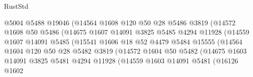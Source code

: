 \begin{lexlean}{RustStd}
\begin{coremodule}
                                @5004
                                @5488
                                @19046
                                (@14564
                                  @1608
                                  @120
                                  @50
                                  @28
                                  @5486
                                  @3819
                                  (@14572
                                    @1608
                                    @50
                                    @5486
                                    (@14675
                                      @1607
                                      @14091
                                      @3825
                                      @5485
                                      @4294
                                      @11928
                                      (@14559
                                        @1607
                                        @14091
                                        @5485
                                        (@15541
                                          @1606
                                          @18
                                          @52
                                          @4479
                                          @5484
                                          @15555
                                          (@14564
                                            @1604
                                            @120
                                            @50
                                            @28
                                            @5482
                                            @3819
                                            (@14572
                                              @1604
                                              @50
                                              @5482
                                              (@14675
                                                @1603
                                                @14091
                                                @3825
                                                @5481
                                                @4294
                                                @11928
                                                (@14559
                                                  @1603
                                                  @14091
                                                  @5481
                                                  (@16126
                                                    @1602

\end{coremodule}
\end{lexlean}
